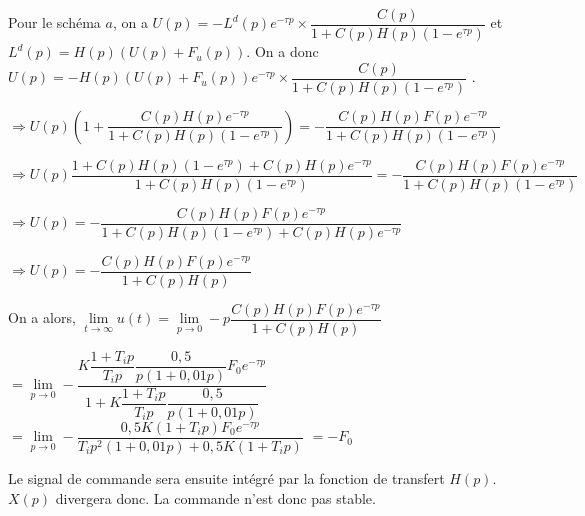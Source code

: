 \ifprof
\begin{corrige} 
Pour le schéma $a$, on a 
$U(p) =-L^d(p) e^{-\tau p} \times \dfrac{C(p)}{1+C(p)H(p)\left( 1- e^{\tau p}\right)}$ 
et $L^d(p) = H(p)\left( U(p)+F_u(p)\right)$.
On a donc 
$U(p) =-H(p)\left( U(p)+F_u(p)\right) e^{-\tau p} \times \dfrac{C(p)}{1+C(p)H(p)\left( 1- e^{\tau p}\right)}$ .

$\Rightarrow 
U(p) \left(1+  \dfrac{C(p) H(p)e^{-\tau p} }{1+C(p)H(p)\left( 1- e^{\tau p}\right)} \right)=-\dfrac{C(p) H(p) F(p) e^{-\tau p} }{1+C(p)H(p)\left( 1- e^{\tau p}\right)}$

$\Rightarrow 
U(p)   \dfrac{1+C(p)H(p)\left( 1- e^{\tau p}\right)+C(p) H(p)e^{-\tau p} }{1+C(p)H(p)\left( 1- e^{\tau p}\right)} =-\dfrac{C(p) H(p) F(p) e^{-\tau p} }{1+C(p)H(p)\left( 1- e^{\tau p}\right)}$

$\Rightarrow 
U(p)   =-\dfrac{C(p) H(p) F(p) e^{-\tau p} }{1+C(p)H(p)\left( 1- e^{\tau p}\right)+C(p) H(p)e^{-\tau p}}$


$\Rightarrow 
U(p)   =-\dfrac{C(p) H(p) F(p) e^{-\tau p} }{1+C(p)H(p)}$


On a alors, 
$\lim\limits_{t \to \infty} u(t) = \lim\limits_{p \to 0} - p \dfrac{C(p) H(p) F(p) e^{-\tau p} }{1+C(p)H(p)}$

$= \lim\limits_{p \to 0}  -\dfrac{K\dfrac{1+T_i p}{T_i p} \dfrac{0,5}{p\left(1+0,01 p \right)} F_0 e^{-\tau p} }{1+K\dfrac{1+T_i p}{T_i p}\dfrac{0,5}{p\left(1+0,01 p \right)}}$
$= \lim\limits_{p \to 0} - \dfrac{0,5K\left(1+T_i p\right)  F_0 e^{-\tau p} }{T_i p^2\left(1+0,01 p \right) +0,5K\left(1+T_i p\right)}$
$=  -  F_0$

Le signal de commande sera ensuite intégré par la fonction de transfert $H(p)$. $X(p)$ divergera donc. 
La commande n'est donc pas stable.

\end{corrige}
\else
\fi


